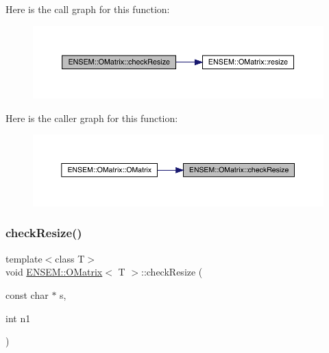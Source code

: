 Here is the call graph for this function\+:
\nopagebreak
\begin{figure}[H]
\begin{center}
\leavevmode
\includegraphics[width=350pt]{dd/d80/classENSEM_1_1OMatrix_a04fb9c7a5ca8da8a54aff3a8bafec571_cgraph}
\end{center}
\end{figure}
Here is the caller graph for this function\+:\nopagebreak
\begin{figure}[H]
\begin{center}
\leavevmode
\includegraphics[width=350pt]{dd/d80/classENSEM_1_1OMatrix_a04fb9c7a5ca8da8a54aff3a8bafec571_icgraph}
\end{center}
\end{figure}
\mbox{\label{classENSEM_1_1OMatrix_a04fb9c7a5ca8da8a54aff3a8bafec571}} 
\subsubsection{\texorpdfstring{checkResize()}{checkResize()}\hspace{0.1cm}{\footnotesize\ttfamily [2/6]}}
{\footnotesize\ttfamily template$<$class T$>$ \\
void \mbox{\hyperlink{classENSEM_1_1OMatrix}{E\+N\+S\+E\+M\+::\+O\+Matrix}}$<$ T $>$\+::check\+Resize (\begin{DoxyParamCaption}\item[{const char $\ast$}]{s,  }\item[{int}]{n1 }\end{DoxyParamCaption})\hspace{0.3cm}{\ttfamily [inline]}}

